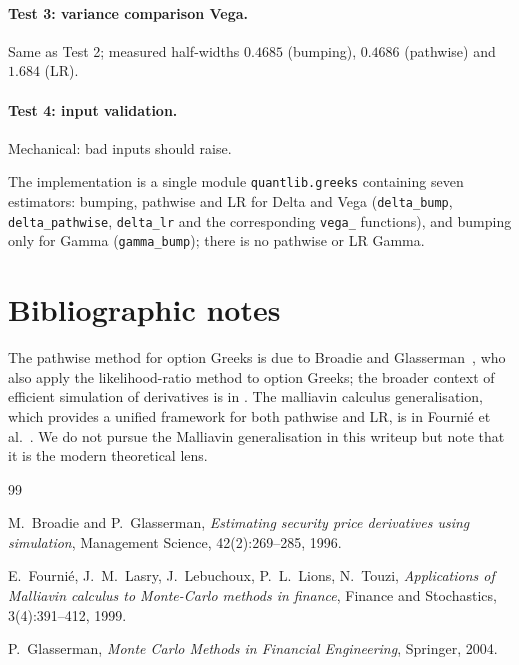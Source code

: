 \documentclass[11pt,a4paper]{article}
\theoremstyle{plain}
\theoremstyle{definition}
\theoremstyle{remark}
\begin{document}
\paragraph{Test 3: variance comparison Vega.} Same as Test 2;
measured half-widths $0.4685$ (bumping), $0.4686$ (pathwise) and
$1.684$ (LR).

\paragraph{Test 4: input validation.} Mechanical: bad inputs
should raise.

The implementation is a single module
\texttt{quantlib.greeks} containing seven estimators: bumping,
pathwise and LR for Delta and Vega (\texttt{delta\_bump},
\texttt{delta\_pathwise}, \texttt{delta\_lr} and the corresponding
\texttt{vega\_} functions), and bumping only for Gamma
(\texttt{gamma\_bump}); there is no pathwise or LR Gamma.

\section{Bibliographic notes}
\label{sec:biblio}

The pathwise method for option Greeks is due to Broadie and
Glasserman~\cite{BroadieGlasserman1996}, who also apply the
likelihood-ratio method to option Greeks; the broader
context of efficient simulation of derivatives is in
\cite[Chapter~7]{Glasserman}. The malliavin calculus generalisation,
which provides a unified framework for both pathwise and LR, is in
Fourni\'e et al.~\cite{FournieEtAl1999}. We do not pursue the
Malliavin generalisation in this writeup but note that it is the
modern theoretical lens.

\begin{thebibliography}{99}

M.\ Broadie and P.\ Glasserman,
\emph{Estimating security price derivatives using simulation},
Management Science, 42(2):269--285, 1996.

E.\ Fourni\'e, J.\ M.\ Lasry, J.\ Lebuchoux, P.\ L.\ Lions, N.\ Touzi,
\emph{Applications of Malliavin calculus to Monte-Carlo methods in
finance},
Finance and Stochastics, 3(4):391--412, 1999.

P.\ Glasserman,
\emph{Monte Carlo Methods in Financial Engineering},
Springer, 2004.

\end{thebibliography}
\end{document}
